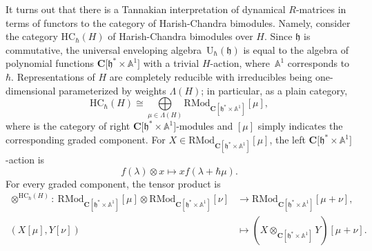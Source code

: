 \documentclass[11pt]{article}
\numberwithin{equation}{section}
\newcommand{\C}{\mathbf{C}}
\newcommand{\U}{\mathrm{U}_{\hbar}}
\newcommand{\h}{\mathfrak{h}}
\newcommand{\HC}{\mathrm{HC}_{\hbar}}
\newcommand{\RMod}{\mathrm{RMod}}
\begin{document}
	It turns out that there is a Tannakian interpretation of dynamical $R$-matrices in terms of functors to the category of Harish-Chandra bimodules. Namely, consider the category $\HC(H)$ of Harish-Chandra bimodules over $H$. Since $\h$ is commutative, the universal enveloping algebra~$\U(\h)$ is equal to the algebra of polynomial functions $\C\bigl[\h^* \times \mathbb{A}^1\bigr]$ with a trivial $H$-action, where~$\mathbb{A}^1$ corresponds to $\hbar$. Representations of $H$ are completely reducible with irreducibles being one-dimensional parameterized by weights $\Lambda(H)$; in particular, as a plain category,
	\[
	\HC(H) \cong \bigoplus\limits_{\mu \in \Lambda(H)} \RMod_{\C[\h^* \times \mathbb{A}^1]}[\mu],
	\]
	where \smash{$\RMod_{\C[\h \times \mathbb{A}^1]}$} is the category of right $\C\bigl[\h^* \times \mathbb{A}^1\bigr]$-modules and $[\mu]$ simply indicates the corresponding graded component. For $X\in \RMod_{\C[\h^* \times \mathbb{A}^1]}[\mu]$, the left $\C\bigl[\h^* \times \mathbb{A}^1\bigr]$-action is
	\begin{equation}
		\label{eq::hc_left_action}
		f(\lambda) \otimes x \mapsto x f(\lambda+\hbar \mu).
	\end{equation}
	For every graded component, the tensor product is
	\begin{align}
			\otimes^{\HC(H)}\colon\ \RMod_{\C[\h^* \times \mathbb{A}^1]} [\mu] \otimes \RMod_{\C[\h^* \times \mathbb{A}^1]} [\nu] & \rightarrow \RMod_{\C[\h^* \times \mathbb{A}^1]} [\mu+\nu],\nonumber \\
(X[\mu],Y[\nu]) & \mapsto (X \otimes_{\C[\h^* \times \mathbb{A}^1]} Y)[\mu+\nu].\label{eq::hc_h_tensor_product}
	\end{align}
	
\end{document}
